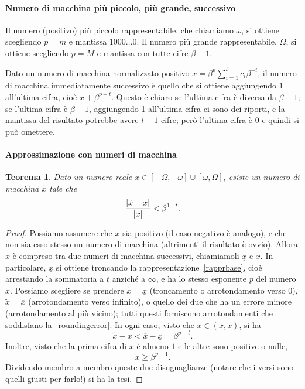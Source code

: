 \documentclass[a4paper]{report}
\DeclarePairedDelimiter{\abs}{\lvert}{\rvert}
\newtheorem{theorem}{Teorema}[chapter]
\theoremstyle{definiton}
\theoremstyle{remark}
\begin{document}
\paragraph{Numero di macchina più piccolo, più grande, successivo}  
Il numero (positivo) più piccolo rappresentabile, che chiamiamo $\omega$, si ottiene scegliendo $p=m$ e mantissa $1000\dots 0$. Il numero più grande rappresentabile, $\Omega$, si ottiene scegliendo $p=M$ e mantissa con tutte cifre $\beta-1$.

Dato un numero di macchina normalizzato positivo $x = \beta^p \sum_{i=1}^t c_i \beta^{-i}$, il numero di macchina immediatamente successivo è quello che si ottiene aggiungendo $1$ all'ultima cifra, cioè $x + \beta^{p-t}$. Questo è chiaro se l'ultima cifra è diversa da $\beta-1$; se l'ultima cifra è $\beta-1$, aggiungendo 1 all'ultima cifra ci sono dei riporti, e la mantissa del risultato potrebbe avere $t+1$ cifre; però l'ultima cifra è $0$ e quindi si può omettere.

\paragraph{Approssimazione con numeri di macchina}

\begin{theorem} Dato un numero reale $x \in [-\Omega, -\omega] \cup [\omega, \Omega]$, esiste un numero di macchina $\tilde{x}$ tale che
\begin{equation} \label{roundingerror}
    \frac{\abs{\tilde{x}-x}}{\abs{x}} < \beta^{1-t}.    
\end{equation}
\end{theorem}
\begin{proof}
Possiamo assumere che $x$ sia positivo (il caso negativo è analogo), e che non sia esso stesso un numero di macchina (altrimenti il risultato è ovvio). Allora $x$ è compreso tra due numeri di macchina successivi, chiamiamoli $\underline{x}$ e $\overline{x}$. In particolare, $\underline{x}$ si ottiene troncando la rappresentazione~\eqref{rapprbase}, cioè arrestando la sommatoria a $t$ anziché a $\infty$, e ha lo stesso esponente $p$ del numero $x$. Possiamo scegliere se prendere $\tilde{x} = \underline{x}$ (troncamento o arrotondamento verso $0$), $\tilde{x} = \overline{x}$ (arrotondamento verso infinito), o quello dei due che ha un errore minore (arrotondamento al più vicino); tutti questi forniscono arrotondamenti che soddisfano la~\eqref{roundingerror}. In ogni caso, visto che $x \in (\underline{x}, \overline{x})$, si ha 
\begin{equation}
    \tilde{x}-x < \overline{x} - \underline{x} = \beta^{p-t}.
\end{equation}
Inoltre, visto che la prima cifra di $x$ è almeno $1$ e le altre sono positive o nulle,
\begin{equation}
    x \geq \beta^{p-1}.
\end{equation}
Dividendo membro a membro queste due disuguaglianze (notare che i versi sono quelli giusti per farlo!) si ha la tesi.
\end{proof}
\end{document}
